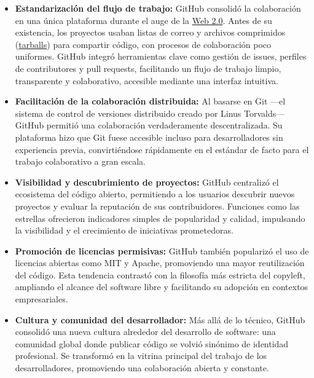 \documentclass[a4paper,12pt]{article}
\begin{document}
\begin{itemize}[label=$\bullet$, itemsep=0.5em]
    \item \textbf{Estandarización del flujo de trabajo:} GitHub consolidó la
    colaboración en una única plataforma durante el auge de la \hyperlink{web2}{Web 2.0}. Antes de
    su existencia, los proyectos usaban listas de correo y archivos comprimidos
    (\hyperlink{tarballs}{tarballs}) para compartir código, con procesos de colaboración poco
    uniformes. GitHub integró herramientas clave como gestión de issues,
    perfiles de contributores y pull requests, facilitando un flujo de trabajo
    limpio, transparente y colaborativo, accesible mediante una interfaz
    intuitiva.

    \item \textbf{Facilitación de la colaboración distribuida:} Al basarse en
    Git —el sistema de control de versiones distribuido creado por Linus
    Torvalds— GitHub permitió una colaboración verdaderamente descentralizada.
    Su plataforma hizo que Git fuese accesible incluso para desarrolladores sin
    experiencia previa, convirtiéndose rápidamente en el estándar de facto para
    el trabajo colaborativo a gran escala.

    \item \textbf{Visibilidad y descubrimiento de proyectos:} GitHub centralizó
    el ecosistema del código abierto, permitiendo a los usuarios descubrir
    nuevos proyectos y evaluar la reputación de sus contribuidores. Funciones
    como las estrellas ofrecieron indicadores simples de popularidad y calidad,
    impulsando la visibilidad y el crecimiento de iniciativas prometedoras.

    \item \textbf{Promoción de licencias permisivas:} GitHub también popularizó
    el uso de licencias abiertas como MIT y Apache, promoviendo una mayor
    reutilización del código. Esta tendencia contrastó con la filosofía más
    estricta del copyleft, ampliando el alcance del software libre y facilitando
    su adopción en contextos empresariales.

    \item \textbf{Cultura y comunidad del desarrollador:} Más allá de lo
    técnico, GitHub consolidó una nueva cultura alrededor del desarrollo de
    software: una comunidad global donde publicar código se volvió sinónimo de
    identidad profesional. Se transformó en la vitrina principal del trabajo de
    los desarrolladores, promoviendo una colaboración abierta y constante.
\end{itemize}
\end{document}
